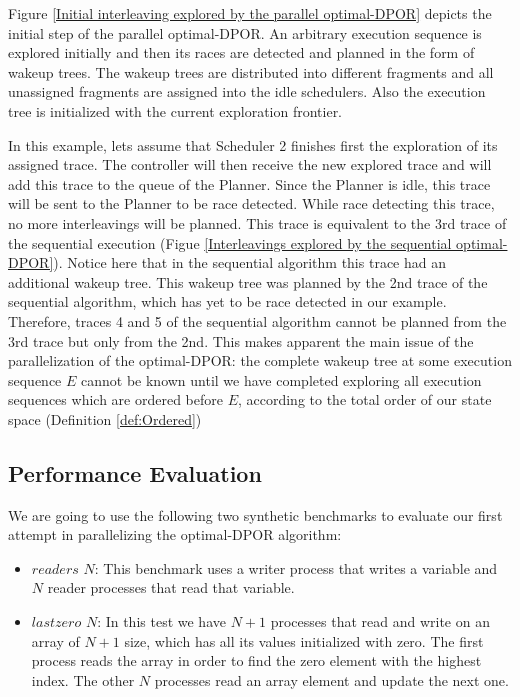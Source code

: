 Figure \ref{Initial interleaving explored by the parallel optimal-DPOR} depicts the initial step of the parallel optimal-DPOR. 
An arbitrary execution sequence is explored initially and then its races are detected and planned in the form of wakeup trees.
The wakeup trees are distributed into different fragments and all unassigned fragments are assigned into the idle schedulers.
Also the execution tree is initialized with the current exploration frontier.

In this example, lets assume that Scheduler 2 finishes first the exploration of its assigned trace. The controller will
then receive the new explored trace and will add this trace to the queue of the Planner. Since the Planner is idle,
this trace will be sent to the Planner to be race detected. While race detecting this trace, no more interleavings will be 
planned. This trace is equivalent to the 3rd trace of the sequential execution 
(Figue \ref{Interleavings explored by the sequential optimal-DPOR}). Notice here that in the sequential algorithm
this trace had an additional wakeup tree. This wakeup tree was planned by the 2nd trace of the sequential algorithm,
which has yet to be race detected in our example. Therefore, traces 4 and 5 of the sequential algorithm cannot be
planned from the 3rd trace but only from the 2nd. This makes apparent the main issue of the parallelization of the optimal-DPOR:
the complete wakeup tree at some execution sequence $E$ cannot be known until we have completed
exploring all execution sequences which are ordered before $E$, according to the total order of our state space
(Definition \ref{def:Ordered})

\subsection{Performance Evaluation}

We are going to use the following two synthetic benchmarks to evaluate
our first attempt in parallelizing the optimal-DPOR algorithm:

\begin{itemize}
    \item $readers$ $N$: This benchmark uses a writer process that writes a variable and $N$ reader processes that read that variable.
    \item $ lastzero$ $N$: In this test we have $N+1$ processes that read and write on an array of $N+1$ size, which has all its 
    values initialized with zero. The first process reads the array in order to find the zero element with the highest
    index. The other $N$ processes read an array element and update the next one.
\end{itemize}

